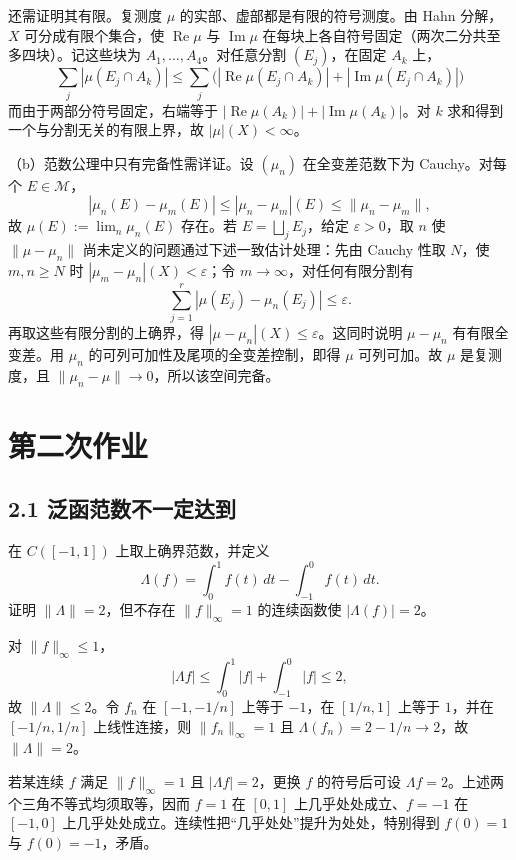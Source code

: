 还需证明其有限。复测度 $\mu$ 的实部、虚部都是有限的符号测度。由 Hahn 分解，$X$ 可分成有限个集合，使 $\operatorname{Re}\mu$ 与 $\operatorname{Im}\mu$ 在每块上各自符号固定（两次二分共至多四块）。记这些块为 $A_1,\dots,A_4$。对任意分割 $(E_j)$，在固定 $A_k$ 上，
\[
\sum_j|\mu(E_j\cap A_k)|
\le\sum_j\bigl(|\operatorname{Re}\mu(E_j\cap A_k)|+|\operatorname{Im}\mu(E_j\cap A_k)|\bigr)
\]
而由于两部分符号固定，右端等于
$|\operatorname{Re}\mu(A_k)|+|\operatorname{Im}\mu(A_k)|$。对 $k$ 求和得到一个与分割无关的有限上界，故 $|\mu|(X)<\infty$。

（b）范数公理中只有完备性需详证。设 $(\mu_n)$ 在全变差范数下为 Cauchy。对每个 $E\in\mathcal M$，
\[
|\mu_n(E)-\mu_m(E)|\le |\mu_n-\mu_m|(E)\le\|\mu_n-\mu_m\|,
\]
故 $\mu(E):=\lim_n\mu_n(E)$ 存在。若 $E=\bigsqcup_jE_j$，给定 $\varepsilon>0$，取 $n$ 使 $\|\mu-\mu_n\|$ 尚未定义的问题通过下述一致估计处理：先由 Cauchy 性取 $N$，使 $m,n\ge N$ 时 $|\mu_m-\mu_n|(X)<\varepsilon$；令 $m\to\infty$，对任何有限分割有
\[
\sum_{j=1}^r|\mu(E_j)-\mu_n(E_j)|\le\varepsilon.
\]
再取这些有限分割的上确界，得 $|\mu-\mu_n|(X)\le\varepsilon$。这同时说明 $\mu-\mu_n$ 有有限全变差。用 $\mu_n$ 的可列可加性及尾项的全变差控制，即得 $\mu$ 可列可加。故 $\mu$ 是复测度，且 $\|\mu_n-\mu\|\to0$，所以该空间完备。

\section{第二次作业}

\subsection*{2.1 泛函范数不一定达到}
\begin{problem}
在 $C([-1,1])$ 上取上确界范数，并定义
\[
\Lambda(f)=\int_0^1f(t)\,dt-\int_{-1}^0f(t)\,dt.
\]
证明 $\|\Lambda\|=2$，但不存在 $\|f\|_\infty=1$ 的连续函数使 $|\Lambda(f)|=2$。
\end{problem}
对 $\|f\|_\infty\le1$，
\[
|\Lambda f|\le\int_0^1|f|+\int_{-1}^0|f|\le2,
\]
故 $\|\Lambda\|\le2$。令 $f_n$ 在 $[-1,-1/n]$ 上等于 $-1$，在 $[1/n,1]$ 上等于 $1$，并在 $[-1/n,1/n]$ 上线性连接，则 $\|f_n\|_\infty=1$ 且
$\Lambda(f_n)=2-1/n\to2$，故 $\|\Lambda\|=2$。

若某连续 $f$ 满足 $\|f\|_\infty=1$ 且 $|\Lambda f|=2$，更换 $f$ 的符号后可设 $\Lambda f=2$。上述两个三角不等式均须取等，因而 $f=1$ 在 $[0,1]$ 上几乎处处成立、$f=-1$ 在 $[-1,0]$ 上几乎处处成立。连续性把“几乎处处”提升为处处，特别得到 $f(0)=1$ 与 $f(0)=-1$，矛盾。

